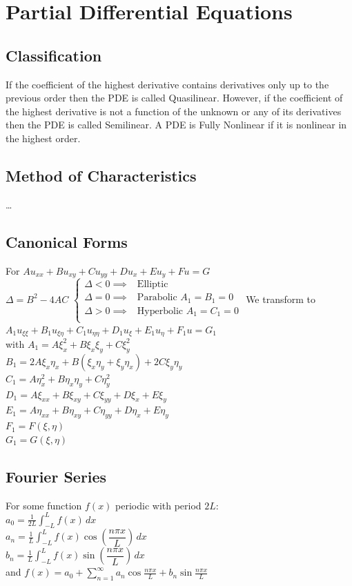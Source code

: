\documentclass[10pt,landscape,letterpaper]{cheatsheet}
\begin{document}
\section*{Partial Differential Equations}
\subsection*{Classification}
If the coefficient of the highest derivative contains derivatives only up
to the previous order then the PDE is called Quasilinear. However, if the coefficient of the
highest derivative is not a function of the unknown or any of its derivatives then the PDE
is called Semilinear. A PDE is Fully Nonlinear if it is nonlinear in the highest order.
\subsection*{Method of Characteristics}
\dots
\subsection*{Canonical Forms}
For
$Au_{xx}+Bu_{xy}+Cu_{yy}+Du_x+Eu_y+Fu=G$\\
$\Delta=B^2-4AC$
$\begin{cases}
                \Delta < 0 \implies & \text{Elliptic}               \\
                \Delta = 0 \implies & \text{Parabolic $A_1=B_1=0$}  \\
                \Delta > 0 \implies & \text{Hyperbolic $A_1=C_1=0$} \\
        \end{cases}
$
We transform to
$A_1u_{\xi\xi}+B_1u_{\xi\eta}+C_1u_{\eta\eta}+D_1u_\xi+E_1u_\eta+F_1u=G_1$\\
with
$A_1  =A\xi_x^2+B\xi_x\xi_y+C\xi_y^2$                          \\
$B_1  =2A\xi_x\eta_x+B(\xi_x\eta_y+\xi_y\eta_x)+2C\xi_y\eta_y$ \\
$C_1  =A\eta_x^2+B\eta_x\eta_y+C\eta_y^2$                      \\
$D_1  =A\xi_{xx}+B\xi_{xy}+C\xi_{yy}+D\xi_x+E\xi_y $           \\
$E_1  =A\eta_{xx}+B\eta_{xy}+C\eta_{yy}+D\eta_x+E\eta_y$       \\
$F_1  =F(\xi,\eta)$                                          \\
$G_1  =G(\xi,\eta)$
\subsection*{Fourier Series}
For some function $f(x)$ periodic with period $2L$:\\
$a_0=\frac{1}{2L}\int_{-L}^{L}f(x)\,dx$\\
$a_n=\frac{1}{L}\int_{-L}^{L}f(x)\cos\left(\dfrac{n\pi x}{L}\right)\,dx$\\
$b_n=\frac{1}{L}\int_{-L}^{L}f(x)\sin\left(\dfrac{n\pi x}{L}\right)\,dx$\\
and
$f(x)=a_0+\sum_{n=1}^{\infty}a_n\cos\frac{n\pi x}{L}+b_n\sin\frac{n\pi x}{L}$
\end{document}
